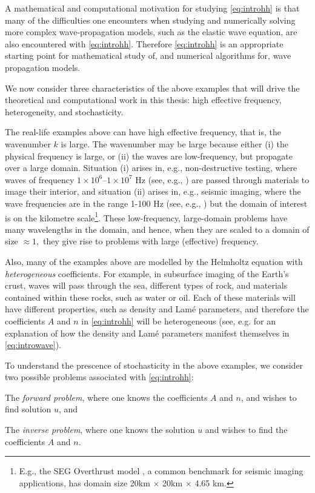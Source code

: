 A mathematical and computational motivation for studying \eqref{eq:introhh} is that many of the difficulties one encounters when studying and numerically solving more complex wave-propagation models, such as the elastic wave equation, are also encountered with \eqref{eq:introhh}. Therefore \eqref{eq:introhh} is an appropriate starting point for mathematical study of, and numerical algorithms for, wave propagation models.

We now consider three characteristics of the above examples that will drive the theoretical and computational work in this thesis: high effective frequency, heterogeneity, and stochasticity.

The real-life examples above can have high effective frequency, that is, the wavenumber $k$ is large. The wavenumber may be large because either (i) the physical frequency is large, or (ii) the waves are low-frequency, but propagate over a large domain. Situation (i) arises in, e.g., non-destructive testing, where waves of frequency $1\times10^6$--$1\times10^7$ Hz (see, e.g., \cite{BS:14}) are passed through materials to image their interior, and situation (ii) arises in, e.g., seismic imaging, where the wave frequencies are in the range 1-100 Hz (see, e.g., \cite{Sc}) but the domain of interest is on the kilometre scale\footnote{E.g., the SEG Overthrust model \cite{AmBrKu:97}, a common benchmark for seismic imaging applications, has domain size 20km $\times$ 20km $\times$ 4.65 km.}. These low-frequency, large-domain problems have many wavelengths in the domain, and hence, when they are scaled to a domain of size $\approx 1,$ they give rise to problems with large (effective) frequency.

Also, many of the examples above are modelled by the Helmholtz equation with \emph{heterogeneous} coefficients. For example, in subsurface imaging of the Earth's crust, waves will pass through the sea, different types of rock, and materials contained within these rocks, such as water or oil. Each of these materials will have different properties, such as density and Lam\'e parameters, and therefore the coefficients $A$ and $n$ in \eqref{eq:introhh} will be heterogeneous (see, e.g. \cite[Section 1.2.4]{Ch:15} for an explanation of how the density and Lam\'e parameters manifest themselves in \eqref{eq:introwave}).

To understand the prescence of stochasticity in the above examples, we consider two possible problems associated with \eqref{eq:introhh}:
\ben
\item The \emph{forward problem}, where one knows the coefficients $A$ and $n$, and wishes to find solution $u$, and
\item The \emph{inverse problem}, where one knows the solution $u$ and wishes to find the coefficients $A$ and $n$.
  \een

